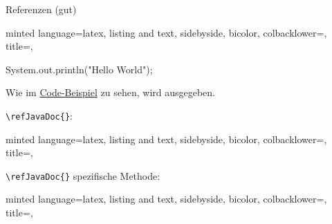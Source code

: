 \documentclass[
    ngerman,
    accentcolor=3b,
    dark_mode,
    fontsize= 12pt,
    a4paper,
    aspectratio=169,
    colorback=true,
    fancy_row_colors,
    leqno,
    fleqn,
    boxarc=3pt,
    fleqn,
]{algoslides}
\begin{document}
    \begin{frame}[c, fragile]
        \slidehead{}
        Referenzen (gut)
        \begin{newcb}[
            fontsize=\scriptsize,
            escapeinside=||,
            ]{
            minted language=latex,
            listing and text,
            sidebyside,
            bicolor,
            colbacklower=,
            title=,
            }
            \label{fig:example}
            \begin{codeBlock}[fontsize=\scriptsize]{
            }
                System.out.println("Hello World");
            \end{codeBlock}

            Wie im \hyperref[fig:example]{Code-Beispiel} zu sehen, wird  ausgegeben.
        \end{newcb}
    \end{frame}
    \begin{frame}[c, fragile]
        \slidehead{}
        \verb+\refJavaDoc{}+:
        \begin{newcb}[
            fontsize=\scriptsize,
            escapeinside=||,
            ]{
            minted language=latex,
            listing and text,
            sidebyside,
            bicolor,
            colbacklower=,
            title=,
            }
            \begin{grayInfoBox}
            \end{grayInfoBox}
        \end{newcb}
    \end{frame}
    \begin{frame}[c, fragile]
        \slidehead{}
        \verb+\refJavaDoc{}+ spezifische Methode:
        \begin{newcb}[
            fontsize=\scriptsize,
            escapeinside=||,
            ]{
            minted language=latex,
            listing and text,
            sidebyside,
            bicolor,
            colbacklower=,
            title=,
            }
            \begin{grayInfoBox}
            \end{grayInfoBox}
        \end{newcb}
    \end{frame}
\end{document}
